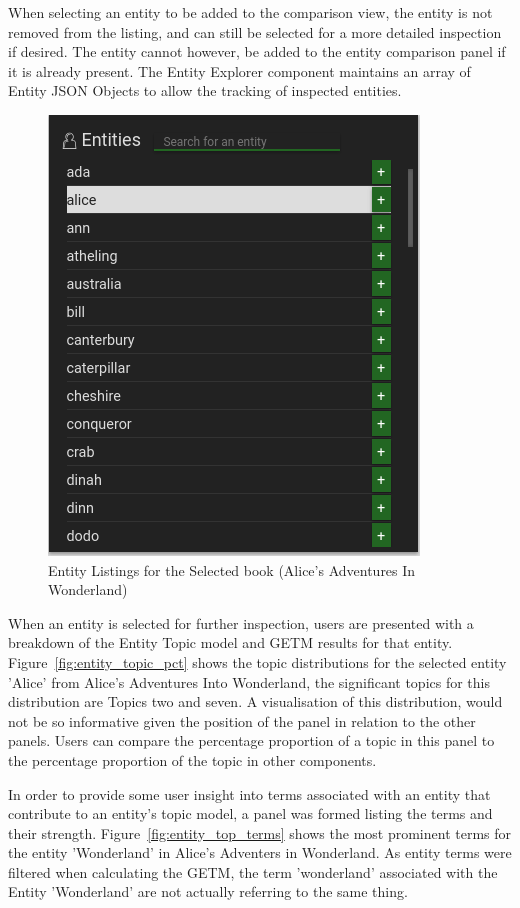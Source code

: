 \documentclass[10pt]{report}
\begin{document}
When selecting an entity to be added to the comparison view, the entity is not removed from the listing, and can still be selected for a more detailed inspection if desired. The entity cannot however, be added to the entity comparison panel if it is already present. The Entity Explorer component maintains an array of Entity JSON Objects to allow the tracking of inspected entities.
\begin{figure}[h]
  \centering
  \includegraphics[scale=0.5]{entity_listing}
  \caption{Entity Listings for the Selected book (Alice's Adventures In Wonderland)\label{fig:entity_listing}}
\end{figure}

When an entity is selected for further inspection, users are presented with a breakdown of the Entity Topic model and GETM results for that entity. Figure~\ref{fig:entity_topic_pct} shows the topic distributions for the selected entity 'Alice' from Alice's Adventures Into Wonderland, the significant topics for this distribution are Topics two and seven. A visualisation of this distribution, would not be so informative given the position of the panel in relation to the other panels. Users can compare the percentage proportion of a topic in this panel to the percentage proportion of the topic in other components.

In order to provide some user insight into terms associated with an entity that contribute to an entity's topic model, a panel was formed listing the terms and their strength. Figure~\ref{fig:entity_top_terms} shows the most prominent terms for the entity 'Wonderland' in Alice's Adventers in Wonderland.  As entity terms were filtered when calculating the GETM, the term 'wonderland' associated with the Entity 'Wonderland' are not actually referring to the same thing.
\end{document}

